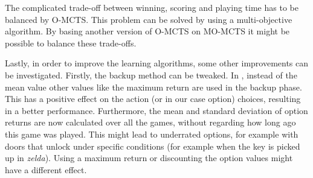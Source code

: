 The complicated trade-off between winning, scoring and playing time has to be
balanced by O-MCTS. This problem can be solved by using a multi-objective
algorithm. By basing another version of O-MCTS on MO-MCTS \cite{wang2012multi}
it might be possible to balance these trade-offs.

Lastly, in order to improve the learning algorithms, some other improvements can be
investigated. Firstly, the backup method can be tweaked. In
\cite{coulom2007efficient}, instead of the mean value other values like the
maximum return are used in the backup phase. This has a positive effect on the
action (or in our case option) choices, resulting in a better performance.
Furthermore, the mean and standard deviation of option returns are now
calculated over all the games, without regarding how long ago this game was
played. This might lead to underrated options, for example with doors that
unlock under specific conditions (for example when the key is picked up in
\textit{zelda}).  Using a maximum return or discounting the option values might
have a different effect.

